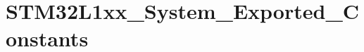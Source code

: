 \hypertarget{group___s_t_m32_l1xx___system___exported___constants}{\section{S\-T\-M32\-L1xx\-\_\-\-System\-\_\-\-Exported\-\_\-\-Constants}
\label{group___s_t_m32_l1xx___system___exported___constants}
}
